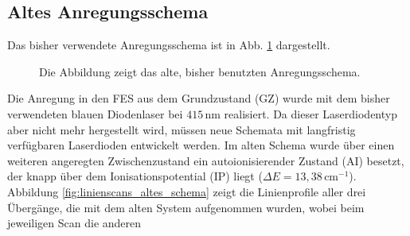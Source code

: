 \subsection{Altes Anregungsschema}\label{subsec:anregungsschema_alt}
Das bisher verwendete Anregungsschema ist in Abb.
\ref{fig:anregungsschema_alt} dargestellt.
\begin{figure}[h]
 	\centering
	\caption[Anregungsschema, alt]{Die Abbildung zeigt das alte, bisher benutzten
	Anregungsschema.}\label{fig:anregungsschema_alt}
\end{figure}
Die Anregung in den FES aus dem Grundzustand (GZ) wurde mit
dem bisher verwendeten blauen Diodenlaser bei $415\,$nm realisiert. Da dieser
Laserdiodentyp aber nicht mehr hergestellt wird, müssen neue Schemata mit langfristig verfügbaren Laserdioden entwickelt
werden. Im alten Schema wurde über einen weiteren angeregten Zwischenzustand ein
autoionisierender Zustand (AI) besetzt, der knapp über dem Ionisationspotential (IP) liegt ($\Delta E=13,38\,$cm$^{-1}$).
Abbildung \ref{fig:linienscans_altes_schema} zeigt die Linienprofile aller drei
Übergänge, die mit dem alten System aufgenommen wurden, wobei beim jeweiligen Scan die anderen
